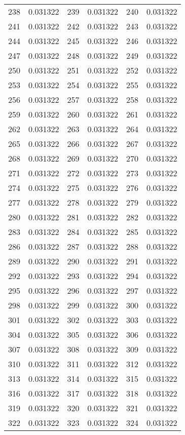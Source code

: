 \documentclass[12pt]{article}
\begin{document}
\begin{longtable}{@{}cc|cc|cc@{}}
238 & 0.031322 & 239 & 0.031322 & 240 & 0.031322 \\
241 & 0.031322 & 242 & 0.031322 & 243 & 0.031322 \\
244 & 0.031322 & 245 & 0.031322 & 246 & 0.031322 \\
247 & 0.031322 & 248 & 0.031322 & 249 & 0.031322 \\
250 & 0.031322 & 251 & 0.031322 & 252 & 0.031322 \\
253 & 0.031322 & 254 & 0.031322 & 255 & 0.031322 \\
256 & 0.031322 & 257 & 0.031322 & 258 & 0.031322 \\
259 & 0.031322 & 260 & 0.031322 & 261 & 0.031322 \\
262 & 0.031322 & 263 & 0.031322 & 264 & 0.031322 \\
265 & 0.031322 & 266 & 0.031322 & 267 & 0.031322 \\
268 & 0.031322 & 269 & 0.031322 & 270 & 0.031322 \\
271 & 0.031322 & 272 & 0.031322 & 273 & 0.031322 \\
274 & 0.031322 & 275 & 0.031322 & 276 & 0.031322 \\
277 & 0.031322 & 278 & 0.031322 & 279 & 0.031322 \\
280 & 0.031322 & 281 & 0.031322 & 282 & 0.031322 \\
283 & 0.031322 & 284 & 0.031322 & 285 & 0.031322 \\
286 & 0.031322 & 287 & 0.031322 & 288 & 0.031322 \\
289 & 0.031322 & 290 & 0.031322 & 291 & 0.031322 \\
292 & 0.031322 & 293 & 0.031322 & 294 & 0.031322 \\
295 & 0.031322 & 296 & 0.031322 & 297 & 0.031322 \\
298 & 0.031322 & 299 & 0.031322 & 300 & 0.031322 \\
301 & 0.031322 & 302 & 0.031322 & 303 & 0.031322 \\
304 & 0.031322 & 305 & 0.031322 & 306 & 0.031322 \\
307 & 0.031322 & 308 & 0.031322 & 309 & 0.031322 \\
310 & 0.031322 & 311 & 0.031322 & 312 & 0.031322 \\
313 & 0.031322 & 314 & 0.031322 & 315 & 0.031322 \\
316 & 0.031322 & 317 & 0.031322 & 318 & 0.031322 \\
319 & 0.031322 & 320 & 0.031322 & 321 & 0.031322 \\
322 & 0.031322 & 323 & 0.031322 & 324 & 0.031322 \\

\end{longtable}
\end{document}
